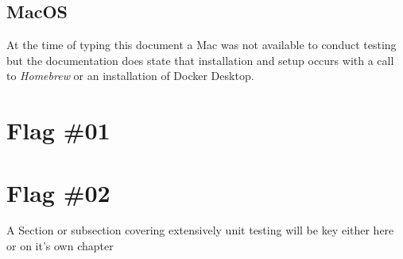 \subsection{MacOS}
At the time of typing this document a Mac was not available to conduct testing
but the documentation\cite{Docker:Mac_Install} does state that installation and setup occurs with a call
to \emph{Homebrew} or an installation of Docker Desktop.

\let\thefootnote\relax{}
\let\thefootnote\relax{}





\section{Flag \#01}



\section{Flag \#02}

%

A Section or subsection covering extensively unit testing will be key either here or on it's own chapter
\newpage

